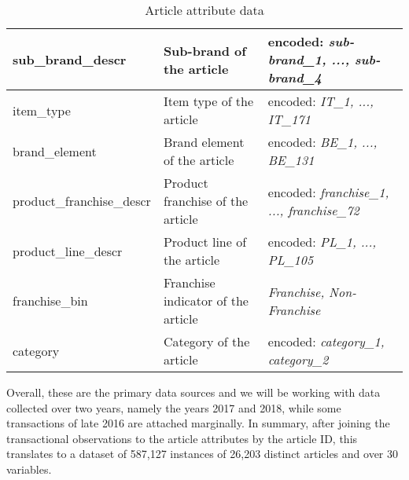 \begin{table}[H]
\begin{adjustbox}{max width=\textwidth}
\begin{tabular}{|l|l|l|}
sub\_brand\_descr         & Sub-brand of the article                               & encoded: \textit{sub-brand\_1, ..., sub-brand\_4 }     \\ \hline
item\_type                & Item type of the article                               & encoded: \textit{IT\_1, ..., IT\_171 }                 \\ \hline
brand\_element            & Brand element of the article                           & encoded: \textit{BE\_1, ..., BE\_131 }                   \\ \hline
product\_franchise\_descr & Product franchise of the article                       & encoded: \textit{franchise\_1, ..., franchise\_72}     \\ \hline
product\_line\_descr      & Product line of the article                            & encoded: \textit{PL\_1, ..., PL\_105 }                 \\ \hline
franchise\_bin            & Franchise indicator of the article                     &\textit{Franchise, Non-Franchise }                     \\ \hline
category                  & Category of the article                                & encoded: \textit{category\_1, category\_2}             \\ \hline
\end{tabular}
\end{adjustbox}
\caption{Article attribute data}
\label{tab:article_master_data}
\end{table}

Overall, these are the primary data sources and we will be working with data collected over two years, namely the years 2017 and 2018, while some transactions of late 2016 are attached marginally. In summary, after joining the transactional observations to the article attributes by the article ID, this translates to a dataset of 587,127 instances of 26,203 distinct articles and over 30 variables. 

